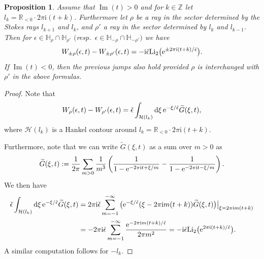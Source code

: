 \documentclass[pdftex]{sigma}
\numberwithin{equation}{section}
\newtheorem{Proposition}[Theorem]{Proposition}
 { \theoremstyle{definition}
\newtheorem{Definition}[Theorem]{Definition}
\newtheorem{Note}[Theorem]{Note}
\newtheorem{Example}[Theorem]{Example}
\newtheorem{Remark}[Theorem]{Remark} }
\begin{document}
\begin{Proposition}\label{Stokesjumps} Assume that $\operatorname{Im}(t)> 0$ and for $k \in \mathbb{Z}$ let $l_k=\mathbb{R}_{<0}\cdot 2\pi \mathrm{i}(t+k)$. Furthermore let $\rho$ be a ray in the sector determined by the Stokes rays $l_{k+1}$ and $l_{k}$, and $\rho'$ a ray in the sector determined by $l_{k}$ and $l_{k-1}$. Then for $\epsilon \in \mathbb{H}_{\rho}\cap \mathbb{H}_{\rho'}$ $($resp.\ $\epsilon \in \mathbb{H}_{-\rho}\cap \mathbb{H}_{-\rho'})$ we have
\begin{equation*}
 W_{\pm \rho}(\epsilon,t)
 -W_{\pm \rho'}(\epsilon,t) =-\mathrm{i}\check{\epsilon}\mathrm{Li}_2\big({\rm e}^{\pm 2\pi \mathrm{i}(t+k)/\check \epsilon}\big).
\end{equation*}
If $\operatorname{Im}(t)<0$, then the previous jumps also hold provided $\rho$ is interchanged with $\rho'$ in the above formulas.
\end{Proposition}

\begin{proof}
Note that
\begin{equation*}
 W_{\rho}(\epsilon,t)-W_{\rho'}(\epsilon, t)=\check{\epsilon}\int_{\mathcal{H}(l_k)}{\rm d}\xi \, {\rm e}^{-\xi/\check \epsilon}\widetilde{G}(\xi,t),
\end{equation*}
where $\mathcal{H}(l_k)$ is a Hankel contour around $l_k =\mathbb{R}_{<0}\cdot 2\pi \mathrm{i} (t + k)$.

Furthermore, note that we can write $\widetilde{G}(\xi,t)$ as a sum over $m>0$ as
\begin{equation*}
 \widetilde{G}(\xi,t):=\frac{1}{2\pi}\sum_{m>0}\frac{1}{m^3}\left(\frac{1}{1-{\rm e}^{-2\pi \mathrm{i} t+\xi/m}}-\frac{1}{1-{\rm e}^{-2\pi \mathrm{i} t-\xi/m}}\right).
\end{equation*}
We then have
\begin{align*}
 \check{\epsilon}\int_{\mathcal{H}(l_k)}{\rm d}\xi\, {\rm e}^{-\xi/\check \epsilon}\widetilde{G}(\xi,t)&=2\pi \mathrm{i} \check{\epsilon} \sum_{m=-1}^{-\infty}\big({\rm e}^{-\xi/\check \epsilon}(\xi-2\pi \mathrm im(t+k))\widetilde{G}(\xi,t)\big)\big|_{\xi=2\pi \mathrm{i} m(t+k)}\\
 &=-2\pi \mathrm{i} \check{\epsilon} \sum_{m=-1}^{-\infty}\frac{{\rm e}^{-2\pi {\rm i}m(t+k)/\check\epsilon}}{2\pi m^2}
 =-\mathrm{i} \check{\epsilon} \mathrm{Li}_2\big({\rm e}^{2\pi \mathrm{i}(t+k)/\check \epsilon}\big).
 \end{align*}
A similar computation follows for $-l_k$.
\end{proof}
\end{document}
